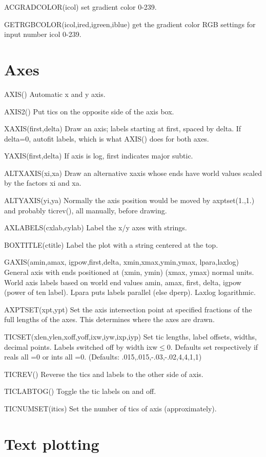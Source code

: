 \documentclass[12pt]{article}
\begin{document}
ACGRADCOLOR(icol) set gradient color 0-239.

GETRGBCOLOR(icol,ired,igreen,iblue) get the gradient color RGB
settings for input number icol 0-239.

\section{Axes}

AXIS() Automatic x and y axis.

AXIS2() Put tics on the opposite side of the axis box.

XAXIS(first,delta) Draw an axis; labels starting at first, spaced by delta.
If delta=0, autofit labels, which is what AXIS() does for both axes.

YAXIS(first,delta) If axis is log, first indicates major subtic.

ALTXAXIS(xi,xa) Draw an alternative xaxis whose ends have world values
scaled by the factors xi and xa.

ALTYAXIS(yi,ya) Normally the axis position would be moved by
axptset(1.,1.) and probably ticrev(), all manually, before drawing.

AXLABELS(cxlab,cylab) Label the x/y axes with strings.

BOXTITLE(ctitle) Label the plot with a string centered at the top.

GAXIS(amin,amax, igpow,first,delta, xmin,xmax,ymin,ymax, lpara,laxlog)
General axis with ends positioned at (xmin, ymin) (xmax, ymax) normal
units. World axis labels based on world end values amin, amax, first, delta,
igpow (power of ten label).  Lpara puts labels parallel (else
dperp). Laxlog logarithmic.

AXPTSET(xpt,ypt) Set the axis intersection point at specified fractions of
the full lengths of the axes. This determines where the axes are drawn.

TICSET(xlen,ylen,xoff,yoff,ixw,iyw,ixp,iyp) Set tic lengths, label
offsets, widths, decimal points. Labels switched off by width
ixw$\le$0. Defaults set respectively if reals all =0 or ints all
=0. (Defaults: .015,.015,-.03,-.02,4,4,1,1)

TICREV() Reverse the tics and labels to the other side of axis.

TICLABTOG() Toggle the tic labels on and off.

TICNUMSET(itics) Set the number of tics of axis (approximately).

\section{Text plotting}
\end{document}
